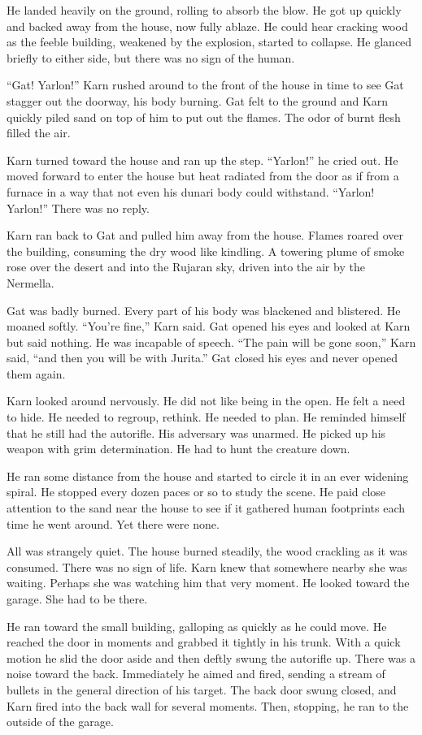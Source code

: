 He landed heavily on the ground, rolling to absorb the blow. He got up quickly and backed away
from the house, now fully ablaze. He could hear cracking wood as the feeble building, weakened
by the explosion, started to collapse. He glanced briefly to either side, but there was no sign
of the human.

``Gat! Yarlon!'' Karn rushed around to the front of the house in time to see Gat stagger out the
doorway, his body burning. Gat felt to the ground and Karn quickly piled sand on top of him to
put out the flames. The odor of burnt flesh filled the air.

Karn turned toward the house and ran up the step. ``Yarlon!'' he cried out. He moved forward to
enter the house but heat radiated from the door as if from a furnace in a way that not even his
dunari body could withstand. ``Yarlon! Yarlon!'' There was no reply.

Karn ran back to Gat and pulled him away from the house. Flames roared over the building,
consuming the dry wood like kindling. A towering plume of smoke rose over the desert and into
the Rujaran sky, driven into the air by the Nermella.

Gat was badly burned. Every part of his body was blackened and blistered. He moaned softly.
``You're fine,'' Karn said. Gat opened his eyes and looked at Karn but said nothing. He was
incapable of speech. ``The pain will be gone soon,'' Karn said, ``and then you will be with
Jurita.'' Gat closed his eyes and never opened them again.

Karn looked around nervously. He did not like being in the open. He felt a need to hide. He
needed to regroup, rethink. He needed to plan. He reminded himself that he still had the
autorifle. His adversary was unarmed. He picked up his weapon with grim determination. He had to
hunt the creature down.

He ran some distance from the house and started to circle it in an ever widening spiral. He
stopped every dozen paces or so to study the scene. He paid close attention to the sand near the
house to see if it gathered human footprints each time he went around. Yet there were none.

All was strangely quiet. The house burned steadily, the wood crackling as it was consumed. There
was no sign of life. Karn knew that somewhere nearby she was waiting. Perhaps she was watching
him that very moment. He looked toward the garage. She had to be there.

He ran toward the small building, galloping as quickly as he could move. He reached the door in
moments and grabbed it tightly in his trunk. With a quick motion he slid the door aside and then
deftly swung the autorifle up. There was a noise toward the back. Immediately he aimed and
fired, sending a stream of bullets in the general direction of his target. The back door swung
closed, and Karn fired into the back wall for several moments. Then, stopping, he ran to the
outside of the garage.


